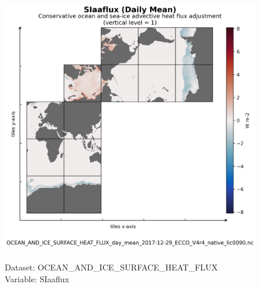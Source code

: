 \begin{figure}[H]
\centering
\includegraphics[scale=0.5]{../images/plots/native_plots/Ocean_and_Sea-Ice_Surface_Heat_Fluxes/SIaaflux.png}
\caption{\\Dataset: OCEAN\_AND\_ICE\_SURFACE\_HEAT\_FLUX\\Variable: SIaaflux}
\label{tab:table-OCEAN_AND_ICE_SURFACE_HEAT_FLUX_SIaaflux-Plot}
\end{figure}
\pagebreak
